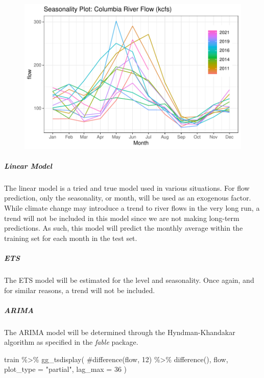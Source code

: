 \documentclass[
  letterpaper,
  DIV=11,
  numbers=noendperiod]{scrartcl}
\let\oldsubparagraph\subparagraph
\renewcommand{\subparagraph}[1]{\oldsubparagraph{#1}\mbox{}}
\newenvironment{Shaded}{\begin{snugshade}}{\end{snugshade}}
\newcommand{\AttributeTok}[1]{\textcolor[rgb]{0.40,0.45,0.13}{#1}}
\newcommand{\CommentTok}[1]{\textcolor[rgb]{0.37,0.37,0.37}{#1}}
\newcommand{\DecValTok}[1]{\textcolor[rgb]{0.68,0.00,0.00}{#1}}
\newcommand{\FunctionTok}[1]{\textcolor[rgb]{0.28,0.35,0.67}{#1}}
\newcommand{\NormalTok}[1]{\textcolor[rgb]{0.00,0.23,0.31}{#1}}
\newcommand{\SpecialCharTok}[1]{\textcolor[rgb]{0.37,0.37,0.37}{#1}}
\newcommand{\StringTok}[1]{\textcolor[rgb]{0.13,0.47,0.30}{#1}}
\begin{document}
\begin{figure}[H]

{\centering \includegraphics{Paper_files/figure-pdf/unnamed-chunk-2-1.pdf}

}

\end{figure}

\hypertarget{linear-model}{%
\subparagraph{\texorpdfstring{\textbf{Linear
Model}}{Linear Model}}\label{linear-model}}

The linear model is a tried and true model used in various situations.
For flow prediction, only the seasonality, or month, will be used as an
exogenous factor. While climate change may introduce a trend to river
flows in the very long run, a trend will not be included in this model
since we are not making long-term predictions. As such, this model will
predict the monthly average within the training set for each month in
the test set.

\hypertarget{ets}{%
\subparagraph{\texorpdfstring{\textbf{ETS}}{ETS}}\label{ets}}

The ETS model will be estimated for the level and seasonality. Once
again, and for similar reasons, a trend will not be included.

\hypertarget{arima}{%
\subparagraph{\texorpdfstring{\textbf{ARIMA}}{ARIMA}}\label{arima}}

The ARIMA model will be determined through the Hyndman-Khandakar
algorithm as specified in the \emph{fable} package.

\begin{Shaded}
\begin{Highlighting}[]
\NormalTok{train }\SpecialCharTok{\%\textgreater{}\%} 
  \FunctionTok{gg\_tsdisplay}\NormalTok{(}
    \CommentTok{\#difference(flow, 12) \%\textgreater{}\% difference(),}
\NormalTok{    flow,}
    \AttributeTok{plot\_type =} \StringTok{"partial"}\NormalTok{, }\AttributeTok{lag\_max =} \DecValTok{36}
\NormalTok{  )}
\end{Highlighting}
\end{Shaded}
\end{document}
